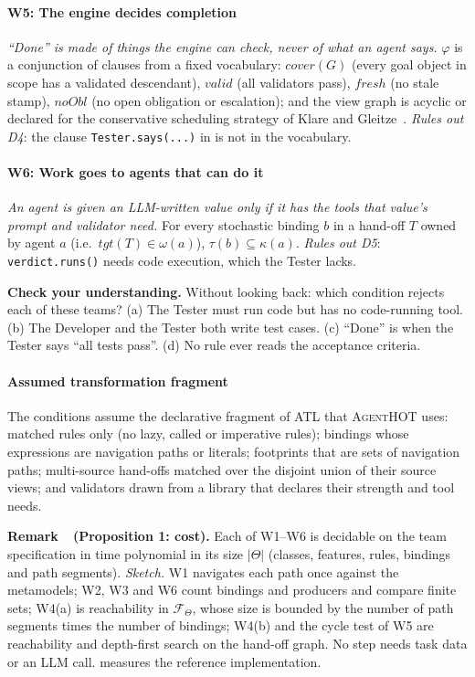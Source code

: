 \documentclass[10pt,a4paper]{article}
\newcommand{\tool}{\textsc{AgentHOT}}
\newcommand{\Team}{\Theta}
\newcommand{\W}[1]{\textsf{W#1}}
\newcommand{\D}[1]{\textsf{D#1}}
\newcommand{\code}[1]{\texttt{#1}}
\newcounter{remark}
\newenvironment{remark}[1][]{%
  \refstepcounter{remark}%
  \begin{tcolorbox}[enhanced, colback=accentlight, colframe=accentlight,
      borderline west={2.2pt}{0pt}{accent}, arc=0pt, boxrule=0pt,
      left=8pt, right=8pt, top=5pt, bottom=5pt, before skip=8pt, after skip=8pt]
  \textsf{\bfseries\color{accent}Remark~\theremark\if\relax\detokenize{#1}\relax\else\ (#1)\fi.}\enspace}%
  {\end{tcolorbox}}
\newenvironment{think}[1][Check your understanding]{%
  \begin{tcolorbox}[enhanced, colback=thinkbg, colframe=thinkbg, arc=0pt, boxrule=0pt,
     borderline west={2.2pt}{0pt}{thinkbar}, left=8pt, right=8pt, top=5pt, bottom=5pt,
     before skip=8pt, after skip=8pt]
  \textsf{\bfseries\color{thinkbar}#1.}\enspace}{\end{tcolorbox}}
\begin{document}
\paragraph{\W{5}: The engine decides completion} \emph{``Done'' is made of
things the engine can check, never of what an agent says.} $\varphi$ is a
conjunction of clauses from a fixed vocabulary: $\mathit{cover}(G)$ (every
goal object in scope has a validated descendant), $\mathit{valid}$ (all
validators pass), $\mathit{fresh}$ (no stale stamp), $\mathit{noObl}$ (no
open obligation or escalation); and the view graph is acyclic or declared
for the conservative scheduling strategy of Klare and
Gleitze~\cite{klare2023termination}. \emph{Rules out \D{4}}: the clause
\code{Tester.says(...)} in  is not in the vocabulary.

\paragraph{\W{6}: Work goes to agents that can do it} \emph{An agent is
given an LLM-written value only if it has the tools that value's prompt and
validator need.} For every stochastic binding $b$ in a hand-off $T$ owned
by agent $a$ (i.e.\ $\mathit{tgt}(T)\in\omega(a)$),
$\tau(b)\subseteq\kappa(a)$. \emph{Rules out \D{5}}: \code{verdict.runs()}
needs code execution, which the Tester lacks.

\begin{think}
Without looking back: which condition rejects each of these teams?
(a) The Tester must run code but has no code-running tool.
(b) The Developer and the Tester both write test cases.
(c) ``Done'' is when the Tester says ``all tests pass''.
(d) No rule ever reads the acceptance criteria.
\end{think}

\paragraph{Assumed transformation fragment} The conditions assume
the declarative fragment of ATL that \tool{} uses: matched rules only (no
lazy, called or imperative rules); bindings whose expressions are
navigation paths or literals; footprints that are sets of navigation paths;
multi-source hand-offs matched over the disjoint union of their source
views; and validators drawn from a library that declares their strength and
tool needs.

\begin{remark}[Proposition 1: cost]
Each of \W{1}--\W{6} is decidable on the team specification in time
polynomial in its size $|\Team|$ (classes, features, rules, bindings and
path segments). \emph{Sketch.} \W{1} navigates each path once against the
metamodels; \W{2}, \W{3} and \W{6} count bindings and producers and compare
finite sets; \W{4}(a) is reachability in $\mathcal{F}_\Team$, whose size is
bounded by the number of path segments times the number of bindings;
\W{4}(b) and the cycle test of \W{5} are reachability and depth-first
search on the hand-off graph. No step needs task data or an LLM call.
 measures the reference implementation.
\end{remark}
\end{document}
